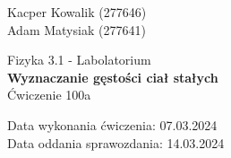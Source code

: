 \begin{flushright}
    Kacper Kowalik (277646) \\
    Adam Matysiak (277641)
\end{flushright}

\vspace{30px}

\begin{center}
    Fizyka 3.1 - Labolatorium \\
    \vspace{15px}
    {\Large{\textbf{Wyznaczanie gęstości ciał stałych}}} \\
    \vspace{15px}
    Ćwiczenie 100a \\
\end{center}

\begin{flushright}
    Data wykonania ćwiczenia: 07.03.2024 \\
    Data oddania sprawozdania: 14.03.2024
\end{flushright}